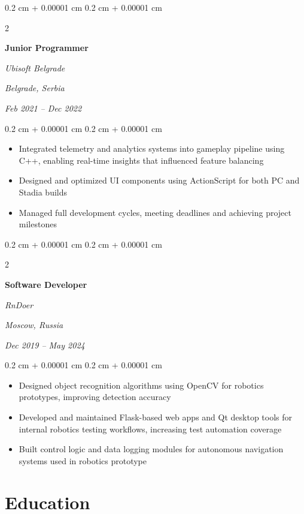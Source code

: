 \documentclass[10pt, letterpaper]{article}
\newenvironment{highlights}{
    \begin{itemize}[
        topsep=0.10 cm,
        parsep=0.10 cm,
        partopsep=0pt,
        itemsep=0pt,
        leftmargin=0.4 cm + 10pt
    ]
}{
    \end{itemize}
} %
\newenvironment{onecolentry}{
    \begin{adjustwidth}{
        0.2 cm + 0.00001 cm
    }{
        0.2 cm + 0.00001 cm
    }
}{
    \end{adjustwidth}
} %
\newenvironment{twocolentry}[2][]{
    \onecolentry
    \def\secondColumn{#2}
    \setcolumnwidth{\fill, 4.5 cm}
    \begin{paracol}{2}
}{
    \switchcolumn \raggedleft \secondColumn
    \end{paracol}
    \endonecolentry
} %
\begin{document}
        \vspace{0.2 cm}

        \begin{twocolentry}{
        \textit{Belgrade, Serbia}    
            
        \textit{Feb 2021 –  Dec 2022}}
            \textbf{Junior Programmer}
            
            \textit{Ubisoft Belgrade}
        \end{twocolentry}

        \vspace{0.10 cm}
        \begin{onecolentry}
            \begin{highlights}
                \item Integrated telemetry and analytics systems into gameplay pipeline using C++, enabling real-time insights that influenced feature balancing
                \item Designed and optimized UI components using ActionScript for both PC and Stadia builds
                \item Managed full development cycles, meeting deadlines and achieving project milestones
            \end{highlights}
        \end{onecolentry}
        
        \vspace{0.2 cm}

        \begin{twocolentry}{
        \textit{Moscow, Russia}    
            
        \textit{Dec 2019 –  May 2024}}
            \textbf{Software Developer}
            
            \textit{RnDoer}
        \end{twocolentry}

        \vspace{0.10 cm}
        \begin{onecolentry}
            \begin{highlights}
                \item Designed object recognition algorithms using OpenCV for robotics prototypes, improving detection accuracy
                \item Developed and maintained Flask-based web apps and Qt desktop tools for internal robotics testing workflows, increasing test automation coverage
                \item Built control logic and data logging modules for autonomous navigation systems used in robotics prototype
            \end{highlights}
        \end{onecolentry}    \section{Education}
\end{document}
